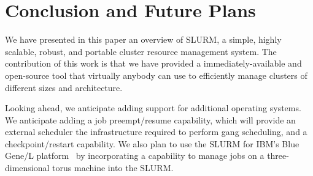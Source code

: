 \section{Conclusion and Future Plans}

We have presented in this paper an overview of SLURM, a simple, highly scalable, robust, 
and portable cluster resource management system.
The contribution of this work is that we have provided a immediately-available
and open-source tool that virtually anybody can use to efficiently manage clusters of 
different sizes and architecture.

Looking ahead, we anticipate adding support for additional 
operating systems.
We anticipate adding a job preempt/resume capability, which will 
provide an external scheduler the infrastructure 
required to perform gang scheduling, and a checkpoint/restart capability.
We also plan to use the SLURM for IBM's Blue Gene/L platform~\cite{BGL} by incorporating a capability
to manage jobs on a three-dimensional torus machine into the SLURM.
